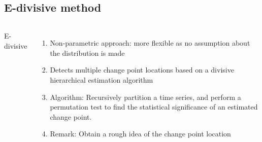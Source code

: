 \documentclass{beamer}
\begin{document}
\subsection{E-divisive method}
\begin{frame}[fragile]

\begin{columns}[c] %
	
	E-divisive \cite{p3}
	\begin{enumerate}
		\item Non-parametric approach: more flexible as no assumption about the distribution is made
		\item Detects multiple change point locations based on a divisive hierarchical estimation algorithm
		\item Algorithm: Recursively partition a time series, and perform a permutation test to find the statistical significance of an estimated change point.
		\item Remark: Obtain a rough idea of the change point location 
	\end{enumerate}
	

\end{columns}
\end{frame}
\end{document}
